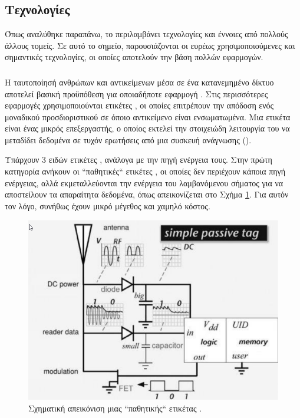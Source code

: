 \subsection{Τεχνολογίες}
Όπως αναλύθηκε παραπάνω, το  περιλαμβάνει τεχνολογίες και έννοιες από πολλούς άλλους τομείς. Σε αυτό το σημείο, παρουσιάζονται οι ευρέως χρησιμοποιούμενες και σημαντικές τεχνολογίες, οι οποίες αποτελούν την βάση πολλών  εφαρμογών.
\subsubsection{}
Η ταυτοποίησή ανθρώπων και αντικείμενων μέσα σε ένα κατανεμημένο δίκτυο αποτελεί βασική προϋπόθεση για οποιαδήποτε εφαρμογή . Στις περισσότερες εφαρμογές χρησιμοποιούνται ετικέτες , οι οποίες επιτρέπουν την απόδοση ενός μοναδικού προσδιοριστικού σε όποιο αντικείμενο είναι ενσωματωμένα. Μια ετικέτα  είναι ένας μικρός επεξεργαστής, ο οποίος εκτελεί την στοιχειώδη λειτουργία του να μεταδίδει δεδομένα σε τυχόν ερωτήσεις από μια συσκευή ανάγνωσης ().
\par
Υπάρχουν 3 ειδών ετικέτες , ανάλογα με την πηγή ενέργεια τους.
Στην πρώτη κατηγορία ανήκουν οι ``παθητικές`` ετικέτες , οι οποίες δεν περιέχουν κάποια πηγή ενέργειας, αλλά εκμεταλλεύονται την ενέργεια του λαμβανόμενου σήματος για να αποστείλουν τα απαραίτητα δεδομένα, όπως απεικονίζεται στο Σχήμα \ref{passRFID}.
Για αυτόν τον λόγο, συνήθως έχουν μικρό μέγεθος και χαμηλό κόστος.
\begin{figure}[h!]
\includegraphics[scale=0.7]{images/pass_RFID.png}
\centering
\caption{Σχηματική απεικόνιση μιας ``παθητικής`` ετικέτας \cite{rfidpass}.}
\label{passRFID}
\end{figure}
